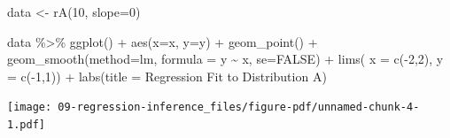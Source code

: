 \documentclass[
  letterpaper,
  DIV=11,
  numbers=noendperiod]{scrreprt}
\newenvironment{Shaded}{\begin{snugshade}}{\end{snugshade}}
\newcommand{\AttributeTok}[1]{\textcolor[rgb]{0.40,0.45,0.13}{#1}}
\newcommand{\ConstantTok}[1]{\textcolor[rgb]{0.56,0.35,0.01}{#1}}
\newcommand{\DecValTok}[1]{\textcolor[rgb]{0.68,0.00,0.00}{#1}}
\newcommand{\FunctionTok}[1]{\textcolor[rgb]{0.28,0.35,0.67}{#1}}
\newcommand{\NormalTok}[1]{\textcolor[rgb]{0.00,0.23,0.31}{#1}}
\newcommand{\OtherTok}[1]{\textcolor[rgb]{0.00,0.23,0.31}{#1}}
\newcommand{\SpecialCharTok}[1]{\textcolor[rgb]{0.37,0.37,0.37}{#1}}
\newcommand{\StringTok}[1]{\textcolor[rgb]{0.13,0.47,0.30}{#1}}
\begin{document}
\begin{Shaded}
\begin{Highlighting}[]
\NormalTok{data }\OtherTok{\textless{}{-}}  \FunctionTok{rA}\NormalTok{(}\DecValTok{10}\NormalTok{, }\AttributeTok{slope=}\DecValTok{0}\NormalTok{)}

\NormalTok{data }\SpecialCharTok{\%\textgreater{}\%} 
  \FunctionTok{ggplot}\NormalTok{() }\SpecialCharTok{+} 
  \FunctionTok{aes}\NormalTok{(}\AttributeTok{x=}\NormalTok{x, }\AttributeTok{y=}\NormalTok{y) }\SpecialCharTok{+} 
  \FunctionTok{geom\_point}\NormalTok{() }\SpecialCharTok{+} 
  \FunctionTok{geom\_smooth}\NormalTok{(}\AttributeTok{method=}\StringTok{\textquotesingle{}lm\textquotesingle{}}\NormalTok{, }\AttributeTok{formula =} \StringTok{\textquotesingle{}y \textasciitilde{} x\textquotesingle{}}\NormalTok{, }\AttributeTok{se=}\ConstantTok{FALSE}\NormalTok{) }\SpecialCharTok{+} 
  \FunctionTok{lims}\NormalTok{(}
    \AttributeTok{x =} \FunctionTok{c}\NormalTok{(}\SpecialCharTok{{-}}\DecValTok{2}\NormalTok{,}\DecValTok{2}\NormalTok{), }
    \AttributeTok{y =} \FunctionTok{c}\NormalTok{(}\SpecialCharTok{{-}}\DecValTok{1}\NormalTok{,}\DecValTok{1}\NormalTok{)) }\SpecialCharTok{+} 
  \FunctionTok{labs}\NormalTok{(}\AttributeTok{title =} \StringTok{\textquotesingle{}Regression Fit to Distribution A\textquotesingle{}}\NormalTok{)}
\end{Highlighting}
\end{Shaded}

\texttt{[image: 09-regression-inference\_files/figure-pdf/unnamed-chunk-4-1.pdf]}
\end{document}
